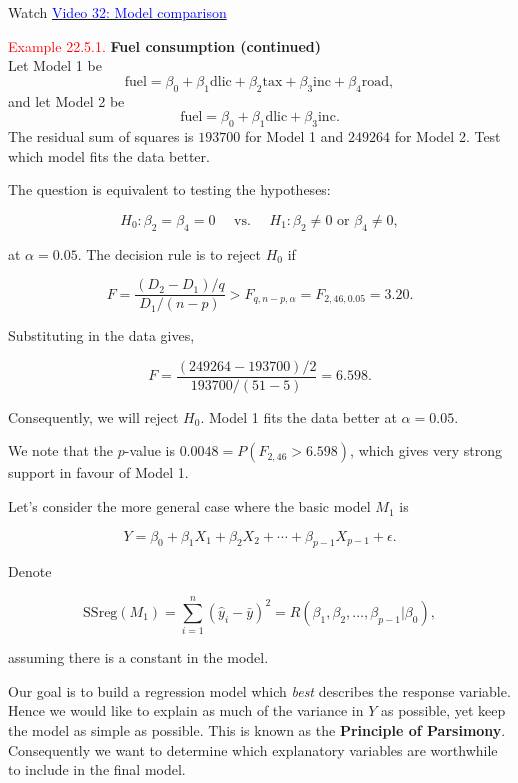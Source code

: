 \documentclass[
]{book}
\begin{document}
Watch \href{https://mediaspace.nottingham.ac.uk/media/Model+Comparison+FINAL+VERSION/1_dhza0pb9}{\textcolor{blue}{Video 32: Model comparison}}

\leavevmode{}%
\textcolor{red}{Example 22.5.1.}
{\textbf{Fuel consumption (continued)}}\\
Let Model 1 be
\[ \text{fuel} = \beta_0 + \beta_1 \text{dlic} + \beta_2 \text{tax} + \beta_3 \text{inc} + \beta_4 \text{road},\]
and let Model 2 be
\[ \text{fuel} = \beta_0 + \beta_1 \text{dlic} + \beta_3 \text{inc}.\]
The residual sum of squares is \(193700\) for Model 1 and \(249264\) for Model 2. Test which model fits the data better.

The question is equivalent to testing the hypotheses:

\[ H_0: \beta_2 = \beta_4 = 0 \quad \text{ vs. } \quad H_1: \beta_2 \neq 0 \text{ or } \beta_4 \neq 0,\]

at \(\alpha = 0.05\). The decision rule is to reject \(H_0\) if

\[ F = \frac{(D_2 - D_1) / q}{D_1 / (n-p)} > F_{q,n-p,\alpha} = F_{2,46,0.05} = 3.20.\]

Substituting in the data gives,

\[ F = \frac{(249264 - 193700)/2}{193700/(51-5)} = 6.598.\]

Consequently, we will reject \(H_0\). Model 1 fits the data better at \(\alpha = 0.05\).

We note that the \(p\)-value is \(0.0048 = P(F_{2,46} >6.598)\), which gives very strong support in favour of Model 1.

\hfill\break

Let's consider the more general case where the basic model \(M_1\) is

\[Y = \beta_0 + \beta_1 X_1 + \beta_2 X_2 + \cdots + \beta_{p-1} X_{p-1} + \epsilon.\]

Denote

\[ \text{SSreg}(M_1) = \sum_{i=1}^n (\hat{y}_i - \bar{y})^2 = R(\beta_1,\beta_2,\dots,\beta_{p-1} | \beta_0),\]

assuming there is a constant in the model.

Our goal is to build a regression model which \emph{best} describes the response variable. Hence we would like to explain as much of the variance in \(Y\) as possible, yet keep the model as simple as possible. This is known as the {\textbf{Principle of Parsimony}}. Consequently we want to determine which explanatory variables are worthwhile to include in the final model.
\end{document}
